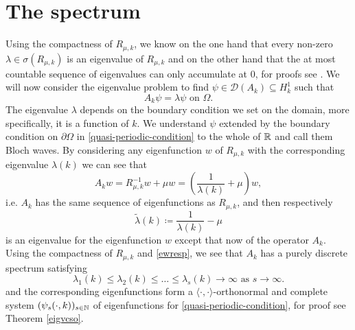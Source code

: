 \section{The spectrum} \label{sec:4.3}
Using the compactness of $R_{\mu, k}$, we know on the one hand that every non-zero $\lambda \in \sigma(R_{\mu, k})$ is an eigenvalue of $R_{\mu, k}$ and on the other hand that the at most countable sequence of eigenvalues can only accumulate at $0$, for proofs see \cite[p. 271]{werner2006funkana}. We will now consider the eigenvalue problem to find $\psi \in \mathcal{D}(A_{k}) \subseteq H_{k}^{1}$ such that
	\begin{equation}
		A_{k} \psi = \lambda \psi \text{ on } \Omega. \label{eigv-problem}
	\end{equation}
The eigenvalue $\lambda$ depends on the boundary condition we set on the domain, more specifically, it is a function of $k$. We understand $\psi$ extended by the boundary condition on $\partial \Omega$ in \eqref{quasi-periodic-condition} to the whole of $\mathbb{R}$ and call them Bloch waves. By considering any eigenfunction $w$ of $R_{\mu, k}$ with the corresponding eigenvalue $\lambda(k)$ we can see that
	\[ A_{k} w = R_{\mu, k}^{-1} w + \mu w = \left(\frac{1}{\lambda(k)} + \mu\right) w, \]
	i.e. $A_{k}$ has the same sequence of eigenfunctions as $R_{\mu, k}$, and then respectively
	\begin{equation}
		\tilde{\lambda}(k) \coloneqq \frac{1}{\lambda(k)} - \mu \label{ewresp}
	\end{equation} 
is an eigenvalue for the eigenfunction $w$ except that now of the operator $A_{k}$. Using the compactness of $R_{\mu, k}$ and \eqref{ewresp}, we see that $A_{k}$ has a purely discrete spectrum satisfying
	\begin{equation}
		\lambda_{1}(k) \leq \lambda_{2}(k) \leq \dotsc \leq \lambda_{s}(k) \rightarrow \infty \text{ as } s \rightarrow \infty. \label{comment-after}
	\end{equation} 
and the corresponding eigenfunctions form a $\langle \cdot , \cdot \rangle$-orthonormal and complete system $(\psi_{s}(\cdot, k))_{s \in \mathbb{N}}$ of eigenfunctions for \eqref{quasi-periodic-condition}, for proof see Theorem \ref{eigvcso}.
~\\

